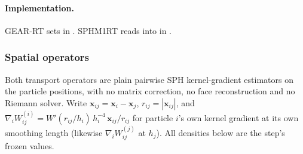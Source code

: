 \paragraph{Implementation.} GEAR-RT sets  in
. SPHM1RT reads
 into  in
.

\subsubsection{Spatial operators}
\label{sec:fuv-operators}

Both transport operators are plain pairwise SPH kernel-gradient
estimators on the particle positions, with no matrix correction, no
face reconstruction and no Riemann solver. Write $\mathbf x_{ij} =
\mathbf x_i - \mathbf x_j$, $r_{ij} = |\mathbf x_{ij}|$, and
$\nabla_i W_{ij}^{(i)} = W'(r_{ij}/h_i)\,h_i^{-4}\,\mathbf x_{ij}/r_{ij}$
for particle $i$'s own kernel gradient at its own smoothing length
(likewise $\nabla_i W_{ij}^{(j)}$ at $h_j$). All densities below are the
step's frozen values.

